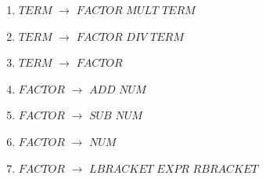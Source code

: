 \begin{enumerate}
\item $TERM$ $\rightarrow$ $FACTOR$ $MULT$ $TERM$\\
\item $TERM$ $\rightarrow$ $FACTOR$ $DIV$ $TERM$\\
\item $TERM$ $\rightarrow$ $FACTOR$\\

\item $FACTOR$ $\rightarrow$ $ADD$ $NUM$ \\
\item $FACTOR$ $\rightarrow$ $SUB$ $NUM$ \\
\item $FACTOR$ $\rightarrow$ $NUM$ \\
\item $FACTOR$ $\rightarrow$ $LBRACKET$ $EXPR$ $RBRACKET$\\



\end{enumerate}

\noindent
